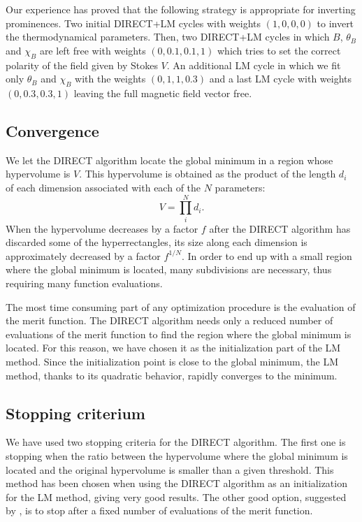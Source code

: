 \documentclass[12pt]{article}
\begin{document}
Our experience has proved that the following strategy is appropriate for inverting
prominences. Two initial DIRECT+LM cycles with weights $(1,0,0,0)$ to
invert the thermodynamical parameters. Then, two DIRECT+LM cycles in which $B$, $\theta_B$
and $\chi_B$ are left free with weights $(0,0.1,0.1,1)$ which tries to set the
correct polarity of the field given by Stokes $V$. An additional LM cycle in which
we fit only $\theta_B$ and $\chi_B$ with the weights $(0,1,1,0.3)$ and a last
LM cycle with weights $(0,0.3,0.3,1)$ leaving the full magnetic field vector free.


\subsection{Convergence}
\label{sec:convergence}
We let the DIRECT algorithm
locate the global minimum in a region whose hypervolume is $V$. This hypervolume is 
obtained as the product of the length $d_i$ of each dimension associated with
each of the $N$ parameters:
\begin{equation}
V = \prod_i^N d_i.
\end{equation}
When the hypervolume decreases by a factor $f$ after the DIRECT algorithm
has discarded some of the hyperrectangles, its size along each dimension is
approximately decreased by a factor $f^{1/N}$. 
In order to end up with a small region
where the global minimum is located, many subdivisions are 
necessary, thus requiring many function evaluations. 

The most time consuming part of any optimization procedure is the evaluation of
the merit function. The DIRECT algorithm needs only a reduced number of evaluations 
of the merit function to find
the region where the global minimum is located. For this reason, we have
chosen it as the initialization part of the LM method. Since the initialization
point is close to the global minimum, the LM method, thanks to its quadratic behavior,
rapidly converges to the minimum.

\subsection{Stopping criterium}
We have used two stopping criteria for the
DIRECT algorithm. The first one is stopping when the ratio between the
hypervolume where
the global minimum is located and the original hypervolume is smaller than a
given threshold.
This method has been chosen when using the DIRECT 
algorithm as an initialization for the LM method, giving very good results. The
other good
option, suggested by \cite{Jones_DIRECT93}, is to stop after a fixed number of
evaluations of the merit function.  
\end{document}
